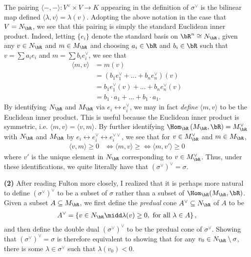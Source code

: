 \begin{homework}[e]
\begin{prf}
		The pairing $\langle -,-\rangle:V^{\vee}\times V\to K$ appearing in the definition of $\sigma^{\vee}$ is the bilinear map defined $\langle \lambda,v\rangle = \lambda(v)$. Adopting the above notation in the case that $V = N_\bR$, we see that this pairing is simply the standard Euclidean inner product. Indeed, letting $\{e_i\}$ denote the standard basis on $\bR^n \cong N_\bR$, given any $v \in N_\bR$ and $m \in M_\bR$ and choosing $a_i \in \bR$ and $b_i \in \bR$ such that $v = \sum a_i e_i$ and $m = \sum b_i e^{\vee}_i$, we see that
		\begin{align*}
			\langle m,v\rangle &= m(v) \\
							   &= (b_1e^{\vee}_1 + ... + b_ne^{\vee}_n)(v) \\
							   &= b_1e^{\vee}_1(v) + ... + b_ne^{\vee}_n(v) \\
							   &= b_1 \cdot a_1 + ... + b_1 \cdot a_1.
		\end{align*}
		By identifying $N_\bR$ and $M_\bR$ via $e_i \leftrightarrow e_i^{\vee}$, we may in fact \emph{define} $\langle m,v\rangle$ to be the Euclidean inner product. This is useful because the Euclidean inner product is symmetric, i.e. $\langle m,v\rangle = \langle v,m\rangle$. By further identifying $\Hom_\bR\left(M_\bR,\bR\right) = M_\bR^{\vee}$ with $N_\bR$ and $M_\bR$ by $e_i \leftrightarrow e_i^{\vee} \leftrightarrow e_i^{\vee\vee}$, we see that for $v \in M_\bR^{\vee}$ and $m \in M_\bR$,
		\begin{align*}
			\langle v,m\rangle \geq 0 &\iff \langle m,v\rangle \geq \iff \langle m,v'\rangle \geq 0
		\end{align*}
		where $v'$ is the unique element in $N_\bR$ corresponding to $v \in M_\bR^{\vee}$. Thus, under these identifications, we quite literally have that $\left(\sigma^{\vee}\right)^{\vee} = \sigma$.

		\bigskip
		
		\textbf{(2)} After reading Fulton more closely, I realized that it is perhaps more natural to define $\left(\sigma^{\vee}\right)^{\vee}$ to be a subset of $\sigma$ rather than a subset of $\Hom_\bR(M_\bR,\bR)$. Given a subset $A \subseteq M_\bR$, we first define the \emph{predual} cone $A^{\vee} \subseteq N_\bR$ of $A$ to be
		\begin{align*}
			A^{\vee} = \left\{v \in N_\bR \midd \lambda(v) \geq 0, \text{ for all } \lambda \in A\right\},
		\end{align*}
		and then define the double dual $\left(\sigma^{\vee}\right)^{\vee}$ to be the predual cone of $\sigma^{\vee}$. Showing that $\left(\sigma^{\vee}\right)^{\vee} = \sigma$ is therefore equivalent to showing that for any $v_0 \in N_\bR \setminus\sigma$, there is some $\lambda \in \sigma^{\vee}$ such that $\lambda(v_0) < 0$.


\end{prf}
\end{homework}
